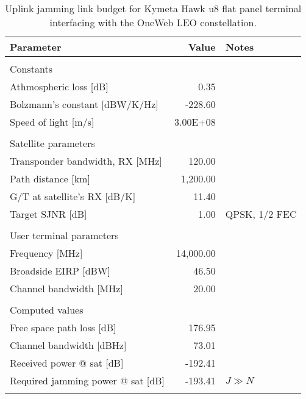 \documentclass[english, 12pt, a4paper, elec, utf8, a-1b, online]{aaltothesis}
\begin{document}
\begin{table}[h]
  \centering
  \caption{Uplink jamming link budget for Kymeta Hawk u8 flat panel terminal interfacing with the OneWeb LEO constellation.}
  \begin{tabular}{@{}lrl@{}}
    \toprule
    Parameter                             & Value     & Notes         \\ \midrule
                                          &           &               \\
    Constants                             &           &               \\ 
    Athmospheric loss {[}dB{]}            & 0.35      &               \\
    Bolzmann’s constant {[}dBW/K/Hz{]}    & -228.60   &               \\
    Speed of light {[}m/s{]}              & 3.00E+08  &               \\
                                          &           &               \\
    Satellite parameters                  &           &               \\ 
    Transponder bandwidth, RX {[}MHz{]}   & 120.00    &               \\
    Path distance {[}km{]}                & 1,200.00  &               \\
    G/T at satellite’s RX {[}dB/K{]}      & 11.40     &               \\
    Target SJNR {[}dB{]}                  & 1.00      & QPSK, 1/2 FEC \\
                                          &           &               \\
    User terminal parameters              &           &               \\ 
    Frequency {[}MHz{]}                   & 14,000.00 &               \\
    Broadside EIRP {[}dBW{]}              & 46.50     &               \\
    Channel bandwidth {[}MHz{]}           & 20.00     &               \\
                                          &           &               \\
    Computed values                       &           &               \\
    Free space path loss {[}dB{]}         & 176.95    &               \\
    Channel bandwidth {[}dBHz{]}          & 73.01     &               \\
    Received power @ sat {[}dB{]}         & -192.41   &               \\
    Required jamming power @ sat {[}dB{]} & -193.41   & $J \gg N$     \\ \bottomrule
    \label{table-ul-jamming-link-budget}
  \end{tabular}
\end{table}
\end{document}
